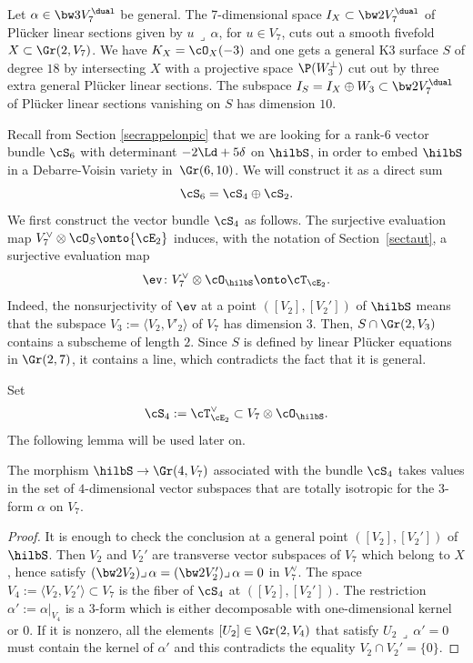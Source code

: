 Let $\alpha\in \bw3V_7^\dual $ be general. The 7-dimensional space $I_X\subset \bw2V_7^\dual $ of
Plücker linear sections given by $u\,\lrcorner\, \alpha$, for $u\in V_7$,
cuts out a smooth fivefold $X\subset \Gr(2,V_7)$. We have $K_X=\cO_X(-3)$ and
one gets a general K3 surface $S$ of degree $18$ by intersecting $X$ with a projective space $\P(W_3^\bot)$ cut out by three extra general Plücker linear sections. The subspace $I_S=I_X\oplus W_3\subset\bw2V_7^\dual $ of Plücker linear sections vanishing on $S$ has dimension $10$.

Recall from Section \ref{secrappelonpic} that we are looking for a rank-$6$ vector bundle $\cS_6$ with determinant $-2\Ld+5\delta$ on $\hilbS$, in order to embed $\hilbS$ in a Debarre-Voisin variety in~$\Gr(6,10)$. We will construct it as a direct sum
\[
\cS_6=\cS_4\oplus \cS_2.
\]
We first construct the vector bundle
$\cS_4$ as follows.
The surjective evaluation map
$V_7^\vee\otimes\cO_S\onto {\cE_2}$
induces, with the notation of Section~\ref{sectaut}, a surjective evaluation map
\[
\label{eqevpourtautonS}
\ev\colon V_7^\vee\otimes\cO_{\hilbS}\onto\cT_{ \cE_2}.
\]
Indeed,
the nonsurjectivity of $\ev$ at a point $([V_2],[V_2'])$ of $\hilbS$
means that the subspace $V_3:=\langle V_2,V'_2\rangle$ of
$ V_7$ has dimension $3$. Then, $S\cap \Gr(2,V_3)$ contains a subscheme of length $2$. Since $S$ is defined by linear Plücker equations in $\Gr(2,7)$, it contains a line, which contradicts the fact that it is general.

Set
\begin{equation}\label{s4}
\cS_4:=\cT_{\cE_2}^\vee \subset V_7\otimes\cO_{\hilbS}.
\end{equation}
The following lemma will be used later on.

\begin{lemm}\label{lepourtrivecteur}
The morphism $\hilbS\to \Gr(4,V_{7})$ associated with
the bundle $\cS_4$ takes values in the set of $4$-dimensional vector subspaces that are totally isotropic for the $3$-form
$\alpha$ on $V_7$.
\end{lemm}

\begin{proof} It is enough to check the conclusion at a general point $([V_2],[V_2'])$ of $\hilbS$. Then $V_2$ and $ V_2'$ are transverse vector subspaces
of $V_7$ which belong to $X$, hence satisfy $(\bw2V_2 )\lrcorner\,\alpha=(\bw2V_2' )\lrcorner\,\alpha=0$ in $V_7^\vee$.
The space $V_4:=\langle V_2,V_2'\rangle\subset V_7$ is the fiber of $\cS_4$ at $([V_2],[V_2'])$. The restriction $\alpha':=\alpha\vert_{ V_4}$
is a $3$-form which is either decomposable with one-dimensional kernel or $0$. If it is nonzero, all the elements
$[U_2]\in \Gr(2,V_4)$ that satisfy $U_2\,\lrcorner\,\alpha'=0$ must contain the kernel of $\alpha'$ and this contradicts the equality
$V_2\cap V_2'=\{0\}$.
\end{proof}

